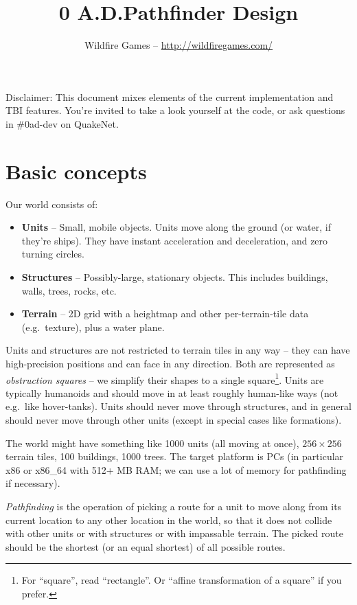 \documentclass[a4paper,10pt]{article}
\title{0 A.D.\@ Pathfinder Design}
\author{Wildfire Games -- \url{http://wildfiregames.com/}}
\begin{document}
\maketitle

Disclaimer: This document mixes elements of the current implementation and TBI features. You're invited to take a look yourself at the code, or ask questions in \#0ad-dev on QuakeNet.

\tableofcontents

\section{Basic concepts}

Our world consists of:
\begin{itemize}
 \item \textbf{Units} --
  Small, mobile objects.
  Units move along the ground (or water, if they're ships).
  They have instant acceleration and deceleration, and zero turning circles.
 \item \textbf{Structures} --
  Possibly-large, stationary objects.
  This includes buildings, walls, trees, rocks, etc.
 \item \textbf{Terrain} --
  2D grid with a heightmap and other per-terrain-tile data (e.g.\ texture),
  plus a water plane.
\end{itemize}

Units and structures are not restricted to terrain tiles in any way --
they can have high-precision positions and can face in any direction.
Both are represented as \emph{obstruction squares} -- we simplify their shapes to
a single square\footnote{For ``square'', read ``rectangle''. Or ``affine transformation of a square'' if you prefer.}.
Units are typically humanoids and should move in at least roughly human-like ways
(not e.g.\ like hover-tanks).
Units should never move through structures,
and in general should never move through other units (except in special cases like formations).

The world might have something like 1000 units (all moving at once),
$256\times256$ terrain tiles, 100 buildings, 1000 trees.
The target platform is PCs (in particular x86 or x86\_64 with 512+ MB RAM;
we can use a lot of memory for pathfinding if necessary).

\emph{Pathfinding} is the operation of picking a route for a unit to move along
from its current location to any other location in the world,
so that it does not collide with other units
or with structures or with impassable terrain.
The picked route should be the shortest (or an equal shortest) of all possible routes.
\end{document}
